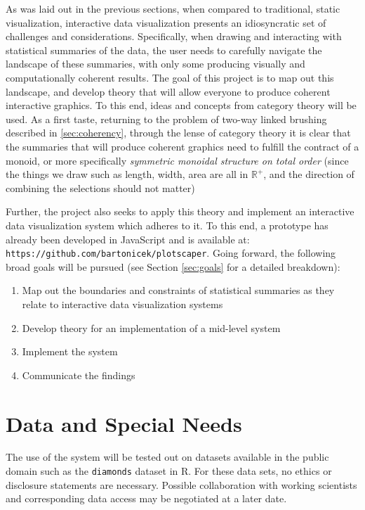 \documentclass[12pt,a4paper]{article}
\begin{document}
As was laid out in the previous sections, when compared to traditional, static visualization, interactive data visualization presents an idiosyncratic set of challenges and considerations. Specifically, when drawing and interacting with statistical summaries of the data, the user needs to carefully navigate the landscape of these summaries, with only some producing visually and computationally coherent results. The goal of this project is to map out this landscape, and develop theory that will allow everyone to produce coherent interactive graphics. To this end, ideas and concepts from category theory will be used. As a first taste, returning to the problem of two-way linked brushing described in \ref{sec:coherency}, through the lense of category theory it is clear that the summaries that will produce coherent graphics need to fulfill the contract of a monoid, or more specifically \textit{symmetric monoidal structure on total order} (since the things we draw such as length, width, area are all in $\mathbb{R}^+$, and the direction of combining the selections should not matter)      

Further, the project also seeks to apply this theory and implement an interactive data visualization system which adheres to it. To this end, a prototype has already been developed in JavaScript and is available at: \texttt{https://github.com/bartonicek/plotscaper}. Going forward, the following broad goals will be pursued (see Section \ref{sec:goals} for a detailed breakdown):  

\begin{enumerate}

\item Map out the boundaries and constraints of statistical summaries as they relate to interactive data visualization systems 
\item Develop theory for an implementation of a mid-level system
\item Implement the system
\item Communicate the findings

\end{enumerate}


\section{Data and Special Needs}
\label{sec:data}

The use of the system will be tested out on datasets available in the public domain such as the \texttt{diamonds} dataset in R. For these data sets, no ethics or disclosure statements are necessary. Possible collaboration with working scientists and corresponding data access may be negotiated at a later date.  
\end{document}
